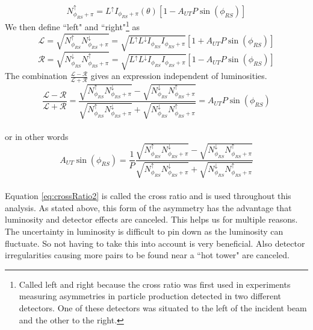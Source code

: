 \documentclass[letterpaper, abstract = on,listof=totoc, bibliography=totoc]{scrreprt}
\newcommand{\phirs}{\phi_{RS}}
\begin{document}
\begin{equation}
\label{eq:nupphi}
N^\uparrow_{\phi_{RS}+\pi} = L^\uparrow I_{\phi_{RS}+\pi}(\theta)\left[1-A_{UT}P\sin(\phi_{RS})\right]
\end{equation}
We then define ``left" and ``right"\footnote{Called left and right because the cross ratio was first used in experiments measuring asymmetries in particle production detected in two different detectors. One of these detectors was situated to the left of the incident beam and the other to the right.} as 
\begin{equation}
\mathcal{L} = \sqrt{N^\uparrow_{\phi_{RS}}N^\downarrow_{\phi_{RS}+\pi}}  = \sqrt{L^\uparrow L^\downarrow I_{\phi_{RS}} I_{\phi_{RS}+\pi}} \left[ 1+A_{UT}P\sin(\phi_{RS})\right]
\end{equation}
\begin{equation}
\mathcal{R} = \sqrt{N^\downarrow_{\phi_{RS}}N^\uparrow_{\phi_{RS}+\pi}} = \sqrt{L^\uparrow L^\downarrow I_{\phi_{RS}} I_{\phi_{RS}+\pi}} \left[ 1-A_{UT}P\sin(\phi_{RS})\right]
\end{equation}
The combination $\frac{\mathcal{L} - \mathcal{R}}{\mathcal{L} + \mathcal{R}}$  gives an expression independent of luminosities. 
\begin{equation}
\label{eq:crossRatio}
\frac{\mathcal{L} - \mathcal{R}}{\mathcal{L} +\mathcal{R}} = \frac{\sqrt{N^\uparrow_{\phi_{RS}}N^\downarrow_{\phi_{RS}+\pi}} - \sqrt{N^\downarrow_{\phi_{RS}}N^\uparrow_{\phi_{RS}+\pi}}}{\sqrt{N^\uparrow_{\phi_{RS}}N^\downarrow_{\phi_{RS}+\pi}} + \sqrt{N^\downarrow_{\phi_{RS}}N^\uparrow_{\phi_{RS}+\pi}}} = A_{UT}P\sin(\phi_{RS})
\end{equation}\\
or in other words
\begin{equation}
\label{eq:crossRatio2}
A_{UT}\sin\left(\phirs\right) = \frac{1}{P}\frac{\sqrt{N^\uparrow_{\phi_{RS}}N^\downarrow_{\phi_{RS}+\pi}} - \sqrt{N^\downarrow_{\phi_{RS}}N^\uparrow_{\phi_{RS}+\pi}}}{\sqrt{N^\uparrow_{\phi_{RS}}N^\downarrow_{\phi_{RS}+\pi}} + \sqrt{N^\downarrow_{\phi_{RS}}N^\uparrow_{\phi_{RS}+\pi}}}
\end{equation}\\

Equation \ref{eq:crossRatio2} is called the cross ratio and is used throughout this analysis. As stated above, this form of the asymmetry has the advantage that luminosity and detector effects are canceled. This helps us for multiple reasons. The uncertainty in luminosity is difficult to pin down as the luminosity can fluctuate. So not having to take this into account is very beneficial. Also detector irregularities causing more pairs to be found near a ``hot tower" are canceled.
\end{document}
